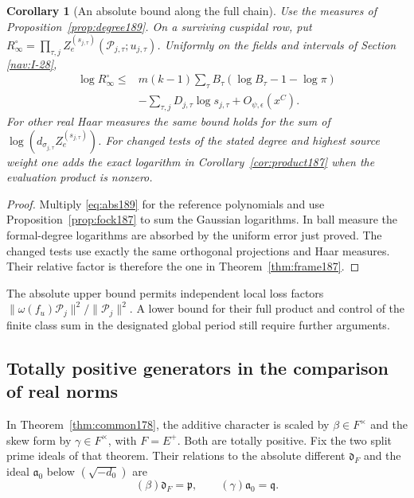 \documentclass[a4paper,11pt]{article}
\newtheorem{corollary}[proposition]{Corollary}
\theoremstyle{definition}
\theoremstyle{remark}
\numberwithin{equation}{section}
\begin{document}
\begin{corollary}[An absolute bound along the full chain]
\label{cor:absall189}
Use the measures of Proposition~\ref{prop:degree189}. On a
surviving cuspidal row, put \(R_\infty^\circ=
\prod_{\tau,j}Z_e^{(s_{j,\tau})}(\mathcal P_{j,\tau};u_{j,\tau})\).
Uniformly on the fields and intervals of Section \ref{nav:I-28},
\begin{align*}
 \log R_\infty^\circ\le {}&
    m(k-1)\sum_\tau B_\tau(\log B_\tau-1-\log\pi)\\
    &-\sum_{\tau,j} D_{j,\tau}\log s_{j,\tau}
       +O_{\psi,\epsilon}(x^C).
\end{align*}
For other real Haar measures the same bound holds for the
sum of \(\log(d_{\sigma_{j,\tau}} Z_e^{(s_{j,\tau})})\).
For changed tests of the stated degree and highest source
weight one adds the exact logarithm in Corollary~\ref{cor:product187}
when the evaluation product is nonzero.
\end{corollary}
\begin{proof}
Multiply \eqref{eq:abs189} for the reference polynomials
and use Proposition~\ref{prop:fock187} to sum the Gaussian
logarithms. In ball measure the formal-degree logarithms
are absorbed by the uniform error just proved. The changed
tests use exactly the same orthogonal projections and Haar
measures. Their relative factor is therefore the one in
Theorem~\ref{thm:frame187}.
\end{proof}

The absolute upper bound permits independent local loss factors
\(\|\omega(f_u)\mathcal P_j\|^2/\|\mathcal P_j\|^2\).
A lower bound for their full product and control of the finite
class sum in the designated global period still require further
arguments.

\subsection{Totally positive generators in the comparison of real norms}\label{nav:VIII-23}
In Theorem~\ref{thm:common178}, the additive character is
scaled by \(\beta\in F^\times\) and the skew form by
\(\gamma\in F^\times\), with \(F=E^+\). Both are totally
positive. Fix the two split prime ideals of that theorem.
Their relations to the absolute different \(\mathfrak d_F\)
and the ideal \(\mathfrak a_0\) below \((\sqrt{-d_0})\) are
\[
  (\beta)\mathfrak d_F=\mathfrak p,\qquad
  (\gamma)\mathfrak a_0=\mathfrak q.
\]
\end{document}
